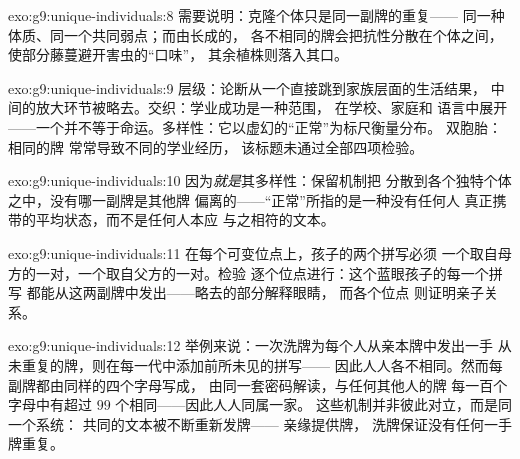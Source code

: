 \begin{solution}{exo:g9:unique-individuals:8}
需要说明：克隆个体只是同一副牌的重复——
同一种体质、同一个共同弱点；而由长成的，
各不相同的牌会把抗性分散在个体之间，
使部分藤蔓避开害虫的“口味”，
其余植株则落入其口。
\end{solution}

\begin{solution}{exo:g9:unique-individuals:9}
层级：论断从一个直接跳到家族层面的生活结果，
中间的放大环节被略去。交织：学业成功是一种范围，
在学校、家庭和
语言中展开——一个并不等于命运。多样性：它以虚幻的“正常”为标尺衡量分布。
双胞胎：相同的牌
常常导致不同的学业经历，
该标题未通过全部四项检验。
\end{solution}

\begin{solution}{exo:g9:unique-individuals:10}
因为\emph{就是}其多样性：保留机制把
分散到各个独特个体之中，没有哪一副牌是其他牌
偏离的——“正常”所指的是一种没有任何人
真正携带的平均状态，而不是任何人本应
与之相符的文本。
\end{solution}

\begin{solution}{exo:g9:unique-individuals:11}
在每个可变位点上，孩子的两个拼写必须
一个取自母方的一对，一个取自父方的一对。检验
逐个位点进行：这个蓝眼孩子的每一个拼写
都能从这两副牌中发出——略去的部分解释眼睛，
而各个位点
则证明亲子关系。
\end{solution}

\begin{solution}{exo:g9:unique-individuals:12}
举例来说：一次洗牌为每个人从亲本牌中发出一手
从未重复的牌，则在每一代中添加前所未见的拼写——
因此人人各不相同。然而每副牌都由同样的四个字母写成，
由同一套密码解读，与任何其他人的牌
每一百个字母中有超过 $99$ 个相同——因此人人同属一家。
这些机制并非彼此对立，而是同一个系统：
共同的文本被不断重新发牌——
亲缘提供牌，
洗牌保证没有任何一手牌重复。
\end{solution}

